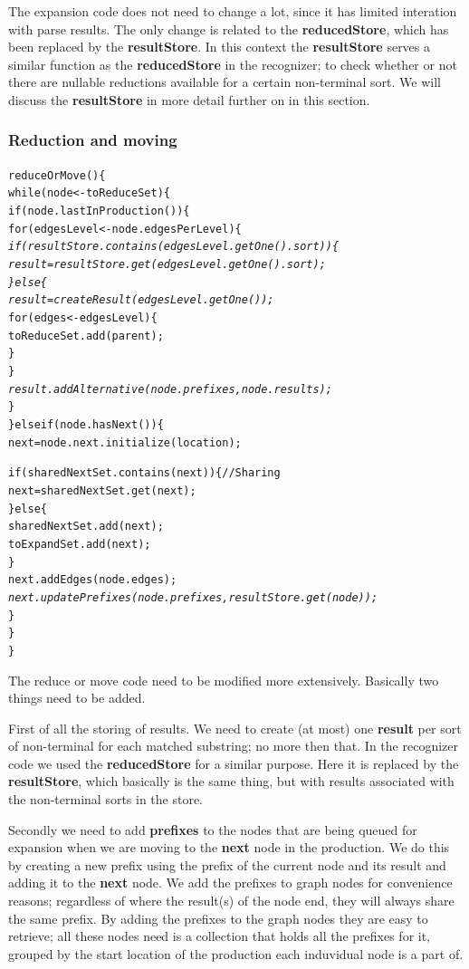 \documentclass[a4paper,10pt]{article}
\begin{document}
The expansion code does not need to change a lot, since it has limited interation with parse results. The only change is related to the {\bf reducedStore}, which has been replaced by the {\bf resultStore}. In this context the {\bf resultStore} serves a similar function as the {\bf reducedStore} in the recognizer; to check whether or not there are nullable reductions available for a certain non-terminal sort. We will discuss the {\bf resultStore} in more detail further on in this section.

\pagebreak
\subsubsection{Reduction and moving}
{\small
\begin{alltt}
reduceOrMove()\{
  while(node <- toReduceSet)\{
    if(node.lastInProduction())\{
      for(edgesLevel <- node.edgesPerLevel)\{\textit{
        if(resultStore.contains(edgesLevel.getOne().sort))\{
          result = resultStore.get(edgesLevel.getOne().sort);
        \}else\{
          result = createResult(edgesLevel.getOne());}
          for(edges <- edgesLevel)\{
            toReduceSet.add(parent);
          \}
        \}\textit{
        result.addAlternative(node.prefixes, node.results);}
      \}
    \}else if(node.hasNext())\{
      next = node.next.initialize(location);
      
      if(sharedNextSet.contains(next))\{ // Sharing
        next = sharedNextSet.get(next);
      \}else\{
        sharedNextSet.add(next);
        toExpandSet.add(next);
      \}
      next.addEdges(node.edges);\textit{
      next.updatePrefixes(node.prefixes, resultStore.get(node));}
    \}
  \}
\}
\end{alltt}
}

The reduce or move code need to be modified more extensively. Basically two things need to be added.

First of all the storing of results. We need to create (at most) one {\bf result} per sort of non-terminal for each matched substring; no more then that. In the recognizer code we used the {\bf reducedStore} for a similar purpose. Here it is replaced by the {\bf resultStore}, which basically is the same thing, but with results associated with the non-terminal sorts in the store.

Secondly we need to add {\bf prefixes} to the nodes that are being queued for expansion when we are moving to the {\bf next} node in the production. We do this by creating a new prefix using the prefix of the current node and its result and adding it to the {\bf next} node. We add the prefixes to graph nodes for convenience reasons; regardless of where the result(s) of the node end, they will always share the same prefix. By adding the prefixes to the graph nodes they are easy to retrieve; all these nodes need is a collection that holds all the prefixes for it, grouped by the start location of the production each induvidual node is a part of.
\end{document}
